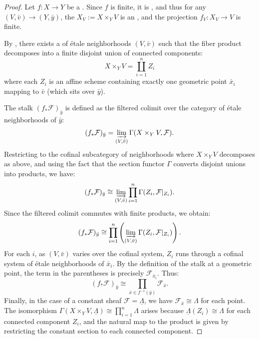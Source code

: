 \begin{proof}
    Let $f: X \to Y$ be a . Since $f$ is finite, it is , and thus for any  $(V, \bar{v}) \to (Y, \bar{y})$, the  $X_V := X \times_Y V$ is an , and the projection $f_V: X_V \to V$ is finite.

    By , there exists a  of étale neighborhoods $(V, \bar{v})$ such that the fiber product decomposes into a finite disjoint union of connected components:
    $$X \times_Y V = \coprod_{i=1}^n Z_i$$
    where each $Z_i$ is an affine scheme containing exactly one geometric point $\bar{x}_i$ mapping to $\bar{v}$ (which sits over $\bar{y}$).

    The stalk $(f_*\mathcal{F})_{\bar{y}}$ is defined as the filtered colimit over the category of étale neighborhoods of $\bar{y}$:
    $$(f_*\mathcal{F})_{\bar{y}} = \varinjlim_{(V, \bar{v})} \Gamma(X \times_Y V, \mathcal{F}).$$
    Restricting to the cofinal subcategory of neighborhoods where $X \times_Y V$ decomposes as above, and using the fact that the section functor $\Gamma$ converts disjoint unions into products, we have:
    $$(f_*\mathcal{F})_{\bar{y}} \cong \varinjlim_{(V, \bar{v})} \prod_{i=1}^n \Gamma(Z_i, \mathcal{F}|_{Z_i}).$$
    Since the filtered colimit commutes with finite products, we obtain:
    $$(f_*\mathcal{F})_{\bar{y}} \cong \prod_{i=1}^n \left( \varinjlim_{(V, \bar{v})} \Gamma(Z_i, \mathcal{F}|_{Z_i}) \right).$$
    For each $i$, as $(V, \bar{v})$ varies over the cofinal system, $Z_i$ runs through a cofinal system of étale neighborhoods of $\bar{x}_i$. By the definition of the stalk at a geometric point, the term in the parentheses is precisely $\mathcal{F}_{\bar{x}_i}$. Thus:
    $$(f_*\mathcal{F})_{\bar{y}} \cong \prod_{\bar{x} \in f^{-1}(\bar{y})} \mathcal{F}_{\bar{x}}.$$
    Finally, in the case of a constant sheaf $\mathcal{F} = \underline{\Lambda}$, we have $\mathcal{F}_{\bar{x}} \cong \Lambda$ for each point. The isomorphism $\Gamma(X \times_Y V, \underline{\Lambda}) \cong \prod_{i=1}^n \Lambda$ arises because $\underline{\Lambda}(Z_i) \cong \Lambda$ for each connected component $Z_i$, and the natural map to the product is given by restricting the constant section to each connected component.
\end{proof}

